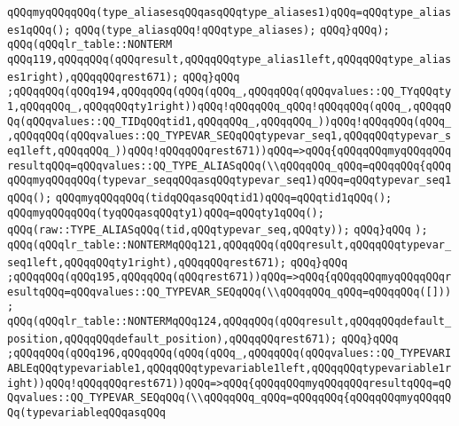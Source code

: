 \verb|qQQqmyqQQqqQQq(type_aliasesqQQqasqQQqtype_aliases1)qQQq=qQQqtype_aliases1qQQq();|\newline
\verb|qQQq(type_aliasqQQq!qQQqtype_aliases);|\newline
\verb|qQQq}qQQq);|\newline
\verb|qQQq(qQQqlr_table::NONTERM|\newline
\verb|qQQq119,qQQqqQQq(qQQqresult,qQQqqQQqtype_alias1left,qQQqqQQqtype_aliases1right),qQQqqQQqrest671);|\newline
\verb|qQQq}qQQq|\newline
\verb|;qQQqqQQq(qQQq194,qQQqqQQq(qQQq(qQQq_,qQQqqQQq(qQQqvalues::QQ_TYqQQqty1,qQQqqQQq_,qQQqqQQqty1right))qQQq!qQQqqQQq_qQQq!qQQqqQQq(qQQq_,qQQqqQQq(qQQqvalues::QQ_TIDqQQqtid1,qQQqqQQq_,qQQqqQQq_))qQQq!qQQqqQQq(qQQq_,qQQqqQQq(qQQqvalues::QQ_TYPEVAR_SEQqQQqtypevar_seq1,qQQqqQQqtypevar_seq1left,qQQqqQQq_))qQQq!qQQqqQQqrest671))qQQq=>qQQq{qQQqqQQqmyqQQqqQQq|\newline
\verb|resultqQQq=qQQqvalues::QQ_TYPE_ALIASqQQq(\\qQQqqQQq_qQQq=qQQqqQQq{qQQqqQQqmyqQQqqQQq(typevar_seqqQQqasqQQqtypevar_seq1)qQQq=qQQqtypevar_seq1qQQq();|\newline
\verb|qQQqmyqQQqqQQq(tidqQQqasqQQqtid1)qQQq=qQQqtid1qQQq();|\newline
\verb|qQQqmyqQQqqQQq(tyqQQqasqQQqty1)qQQq=qQQqty1qQQq();|\newline
\verb|qQQq(raw::TYPE_ALIASqQQq(tid,qQQqtypevar_seq,qQQqty));|\newline
\verb|qQQq}qQQq|\newline
\verb|);|\newline
\verb|qQQq(qQQqlr_table::NONTERMqQQq121,qQQqqQQq(qQQqresult,qQQqqQQqtypevar_seq1left,qQQqqQQqty1right),qQQqqQQqrest671);|\newline
\verb|qQQq}qQQq|\newline
\verb|;qQQqqQQq(qQQq195,qQQqqQQq(qQQqrest671))qQQq=>qQQq{qQQqqQQqmyqQQqqQQqresultqQQq=qQQqvalues::QQ_TYPEVAR_SEQqQQq(\\qQQqqQQq_qQQq=qQQqqQQq([]));|\newline
\verb|qQQq(qQQqlr_table::NONTERMqQQq124,qQQqqQQq(qQQqresult,qQQqqQQqdefault_position,qQQqqQQqdefault_position),qQQqqQQqrest671);|\newline
\verb|qQQq}qQQq|\newline
\verb|;qQQqqQQq(qQQq196,qQQqqQQq(qQQq(qQQq_,qQQqqQQq(qQQqvalues::QQ_TYPEVARIABLEqQQqtypevariable1,qQQqqQQqtypevariable1left,qQQqqQQqtypevariable1right))qQQq!qQQqqQQqrest671))qQQq=>qQQq{qQQqqQQqmyqQQqqQQqresultqQQq=qQQqvalues::QQ_TYPEVAR_SEQqQQq(\\qQQqqQQq_qQQq=qQQqqQQq{qQQqqQQqmyqQQqqQQq(typevariableqQQqasqQQq|\newline
